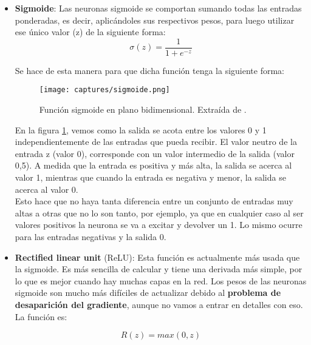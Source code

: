 \documentclass[11pt,fleqn]{book} %
\begin{document}
\begin{itemize}
	\item \textbf{Sigmoide}: Las neuronas sigmoide se comportan sumando todas las entradas ponderadas, es decir, aplicándoles sus respectivos pesos, para luego utilizar ese único valor (z) de la siguiente forma: 
	\begin{equation}
	\sigma(z) = \frac{1}{1+e^{-z}}
	\end{equation}
	
	Se hace de esta manera para que dicha función tenga la siguiente forma:
	
	\begin{figure}[H]
		\centering\texttt{[image: captures/sigmoide.png]}
		\caption{Función sigmoide en plano bidimensional. Extraída de \cite{article:redNeuronal2}.}
		\label{fig:sigmoide} %
	\end{figure}

	En la figura \ref{fig:sigmoide}, vemos como la salida se acota entre los valores 0 y 1 independientemente de las entradas que pueda recibir. El valor neutro de la entrada z (valor 0), corresponde con un valor intermedio de la salida (valor 0,5). A medida que la entrada es positiva y más alta, la salida se acerca al valor 1, mientras que cuando la entrada es negativa y menor, la salida se acerca al valor 0. \\
	
	Esto hace que no haya tanta diferencia entre un conjunto de entradas muy altas a otras que no lo son tanto, por ejemplo, ya que en cualquier caso al ser valores positivos la neurona se va a excitar y devolver un 1. Lo mismo ocurre para las entradas negativas y la salida 0. \\
	
	\item \textbf{Rectified linear unit} (ReLU): Esta función es actualmente más usada que la sigmoide. Es más sencilla de calcular y tiene una derivada más simple, por lo que es mejor cuando hay muchas capas en la red. Los pesos de las neuronas sigmoide son mucho más difíciles de actualizar debido al \textbf{problema de desaparición del gradiente}, aunque no vamos a entrar en detalles con eso. La función es:
	
	\begin{equation}
	R(z) = max(0,z)
	\end{equation}
	

\end{itemize}
\end{document}
